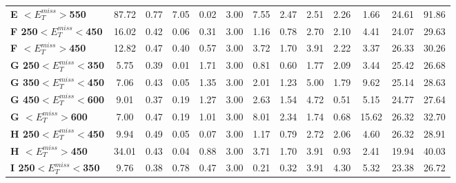 \begin{table}[h]
\begin{center}
{\begin{tabular}{|l|cccccccccccc|}
\textbf{ E $<E_T^{miss}>$550}    & 87.72         & 0.77          & 7.05          & 0.02          & 3.00          & 7.55          & 2.47          & 2.51          & 2.26          & 1.66          & 24.61         & 91.86         \\
\textbf{ F 250$<E_T^{miss}<$450}         & 16.02         & 0.42          & 0.06          & 0.31          & 3.00          & 1.16          & 0.78          & 2.70          & 2.10          & 4.41          & 24.07         & 29.63         \\
\textbf{ F $<E_T^{miss}>$450}    & 12.82         & 0.47          & 0.40          & 0.57          & 3.00          & 3.72          & 1.70          & 3.91          & 2.22          & 3.37          & 26.33         & 30.26         \\
\textbf{ G 250$<E_T^{miss}<$350}         & 5.75          & 0.39          & 0.01          & 1.71          & 3.00          & 0.81          & 0.60          & 1.77          & 2.09          & 3.44          & 25.42         & 26.68         \\
\textbf{ G 350$<E_T^{miss}<$450}         & 7.06          & 0.43          & 0.05          & 1.35          & 3.00          & 2.01          & 1.23          & 5.00          & 1.79          & 9.62          & 25.14         & 28.63         \\
\textbf{ G 450$<E_T^{miss}<$600}         & 9.01          & 0.37          & 0.19          & 1.27          & 3.00          & 2.63          & 1.54          & 4.72          & 0.51          & 5.15          & 24.77         & 27.64         \\
\textbf{ G $<E_T^{miss}>$600}    & 7.00          & 0.47          & 0.19          & 1.01          & 3.00          & 8.01          & 2.34          & 1.74          & 0.68          & 15.62         & 26.32         & 32.70         \\
\textbf{ H 250$<E_T^{miss}<$450}         & 9.94          & 0.49          & 0.05          & 0.07          & 3.00          & 1.17          & 0.79          & 2.72          & 2.06          & 4.60          & 26.32         & 28.91         \\
\textbf{ H $<E_T^{miss}>$450}    & 34.01         & 0.43          & 0.04          & 0.88          & 3.00          & 3.71          & 1.70          & 3.91          & 0.93          & 2.41          & 19.94         & 40.03         \\
\textbf{ I 250$<E_T^{miss}<$350}         & 9.76          & 0.38          & 0.78          & 0.47          & 3.00          & 0.21          & 0.32          & 3.91          & 4.30          & 5.32          & 23.38         & 26.72         \\

\end{tabular}}
\end{center}
\end{table}
